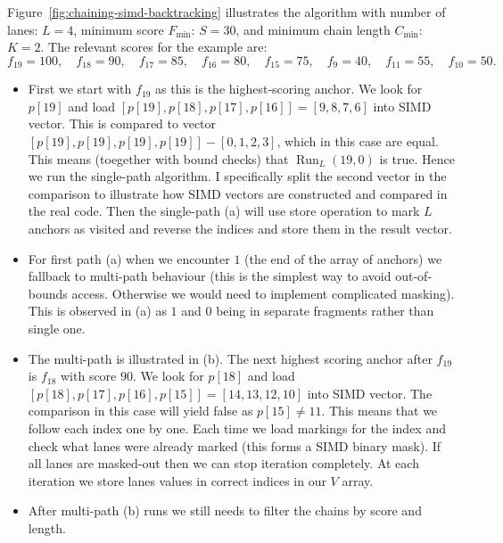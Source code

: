 Figure~\ref{fig:chaining-simd-backtracking} illustrates the algorithm with
number of lanes: \(L=4\), minimum score $F_{\text{min}}$: \(S=30\), and minimum chain length $C_{\text{min}}$: \(K=2\). 
The relevant scores for the example are:
\[
  f_{19}=100,\quad f_{18}=90,\quad f_{17}=85,\quad f_{16}=80,\quad
  f_{15}=75,\quad f_9=40,\quad f_{11}=55,\quad f_{10}=50.
\]
\begin{itemize}
  \item First we start with $f_{19}$ as this is the highest-scoring anchor. We look for $p[19]$ and load $[p[19], p[18], p[17], p[16]] = [9, 8, 7, 6]$ into SIMD vector. This is compared to vector ${[p[19], p[19], p[19], p[19]] - [0, 1, 2, 3]}$, which in this case are equal. This means (toegether with bound checks) that $\operatorname{Run}_L(19,0)$ is true. Hence we run the single-path algorithm. I specifically split the second vector in the comparison to illustrate how SIMD vectors are constructed and compared in the real code. Then the single-path (a) will use store operation to mark $L$ anchors as visited and reverse the indices and store them in the result vector.
  \item For first path (a) when we encounter $1$ (the end of the array of anchors) we fallback to multi-path behaviour (this is the simplest way to avoid out-of-bounds access. Otherwise we would need to implement complicated masking). This is observed in (a) as $1$ and $0$ being in separate fragments rather than single one.
  \item The multi-path is illustrated in (b). The next highest scoring anchor after $f_{19}$ is $f_{18}$ with score $90$. We look for $p[18]$ and load $[p[18], p[17], p[16], p[15]] = [14, 13, 12, 10]$ into SIMD vector. The comparison in this case will yield false as $p[15] \neq 11$. This means that we follow each index one by one. Each time we load markings for the index and check what lanes were already marked (this forms a SIMD binary mask). If all lanes are masked-out then we can stop iteration completely. At each iteration we store lanes values in correct indices in our $V$ array.
  \item After multi-path (b) runs we still needs to filter the chains by score and length. 
\end{itemize}


